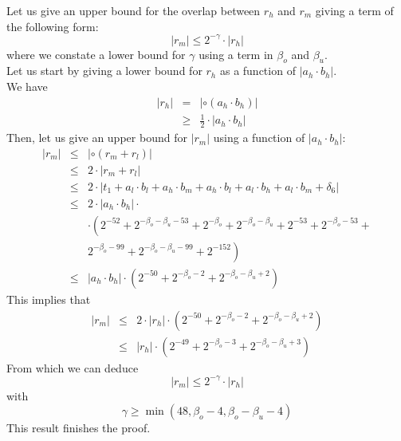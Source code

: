 \documentclass[a4paper,10pt,twoside]{article}
\newenvironment{proof}[1][Proof]{\begin{trivlist}
\item[\hskip \labelsep {\bfseries #1}]}{\end{trivlist}}
\newcommand{\qed}{\nobreak \ifvmode \relax \else \ifdim \lastskip<1.5em \hskip-\lastskip
\hskip1.5em plus0em minus0.5em \fi \nobreak \vrule height0.75em width0.5em depth0.25em\fi}
\newcommand{\hi}{\ensuremath{\mathit{h}}}
\newcommand{\mi}{\ensuremath{\mathit{m}}}
\newcommand{\lo}{\ensuremath{\mathit{l}}}
\begin{document}
\begin{proof}
Let us give an upper bound for the overlap between $r_\hi$ and $r_\mi$ giving a term of the following form:
$$\left \vert r_\mi \right \vert \leq 2^{-\gamma} \cdot \left \vert r_\hi \right \vert$$
where we constate a lower bound for $\gamma$ using a term in $\beta_o$ and $\beta_u$.\\
Let us start by giving a lower bound for $r_\hi$ as a function of $\left \vert a_\hi \cdot b_\hi \right \vert$.\\ We have
\begin{eqnarray*}
\left \vert r_\hi \right \vert & = & \left \vert \circ \left( a_\hi \cdot b_\hi \right) \right \vert \\
& \geq & \frac{1}{2} \cdot \left \vert a_\hi \cdot b_\hi \right \vert
\end{eqnarray*}
Then, let us give an upper bound for $\left \vert r_\mi \right \vert$ using a function of
$\left \vert a_\hi \cdot b_\hi \right \vert$:
\begin{eqnarray*}
\left \vert r_\mi \right \vert & \leq & \left \vert \circ \left( r_\mi + r_\lo \right) \right \vert \\
& \leq & 2 \cdot \left \vert r_\mi + r_\lo \right \vert \\
& \leq &
2 \cdot \left \vert t_1 + a_\lo \cdot b_\lo + a_\hi \cdot b_\mi + a_\hi \cdot b_\lo + a_\lo \cdot b_\hi + a_\lo \cdot b_\mi + \delta_6 \right \vert \\
& \leq & 2 \cdot \left \vert a_\hi \cdot b_\hi \right \vert \cdot \\
& & \cdot \left(
2^{-52} +
2^{-\beta_o-\beta_u-53} +
2^{-\beta_o} +
2^{-\beta_o-\beta_u} +
2^{-53} +
2^{-\beta_o-53} +  \right. \\ & & \left.
2^{-\beta_o-99} +
2^{-\beta_o-\beta_u-99} +
2^{-152} \right) \\
& \leq & \left \vert a_\hi \cdot b_\hi \right \vert
\cdot \left(
2^{-50} +
2^{-\beta_o-2} +
2^{-\beta_o-\beta_u+2} \right)
\end{eqnarray*}
This implies that
\begin{eqnarray*}
\left \vert r_\mi \right \vert & \leq & 2 \cdot \left \vert r_\hi \right \vert \cdot \left(
2^{-50} +
2^{-\beta_o-2} +
2^{-\beta_o-\beta_u+2} \right) \\
& \leq & \left \vert r_\hi \right \vert \cdot \left(
2^{-49} +
2^{-\beta_o-3} +
2^{-\beta_o-\beta_u+3} \right)
\end{eqnarray*}
From which we can deduce
$$\left \vert r_\mi \right \vert \leq 2^{-\gamma} \cdot \left \vert r_\hi \right \vert$$
with
$$\gamma \geq \min \left( 48, \beta_o - 4, \beta_o -\beta_u -4 \right)$$
This result finishes the proof.\qed
\end{proof}
\end{document}
